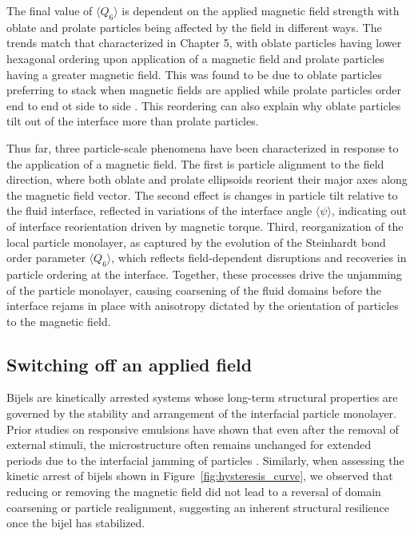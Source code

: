 The final value of \(\langle Q_6 \rangle\) is dependent on the applied magnetic field strength with oblate and prolate particles being affected by the field in
different ways. The trends match that characterized in Chapter 5, with oblate particles having lower hexagonal ordering upon application of a magnetic field
and prolate particles having a greater magnetic field. This was found to be due to oblate particles preferring to stack when magnetic fields are applied while
prolate particles order end to end ot side to side \cite{dabat_mesoscale_2018, eatson_capillary_2023}. This reordering can also explain why oblate particles
tilt out of the interface more than prolate particles.

Thus far, three particle-scale phenomena have been characterized in response to the application of a magnetic field. The first is
particle alignment to the field direction, where both oblate and prolate ellipsoids reorient their major axes along the magnetic field vector. The second effect is
changes in particle tilt relative to the fluid interface, reflected in variations of the interface angle \(\langle \psi \rangle\), indicating out of interface 
reorientation driven by magnetic torque. Third, reorganization of the local particle monolayer, as captured by the evolution of the Steinhardt bond order parameter 
\(\langle Q_6 \rangle\), which reflects field-dependent disruptions and recoveries in particle ordering at the interface. Together, these processes 
drive the unjamming of the particle monolayer, causing coarsening of the fluid domains before the interface rejams in place with anisotropy dictated by the orientation
of particles to the magnetic field.

\subsection{Switching off an applied field}
\label{decreasing-the-applied-field}

Bijels are kinetically arrested systems whose long-term structural properties are governed by the stability and arrangement 
of the interfacial particle monolayer. Prior studies on responsive emulsions have shown that even after the removal of external 
stimuli, the microstructure often remains unchanged for extended periods due to the interfacial 
jamming of particles \cite{cui_stabilizing_2013}. Similarly, when assessing the kinetic arrest of bijels shown 
in Figure~\ref{fig:hysteresis_curve}, we observed that reducing or removing the magnetic field did not 
lead to a reversal of domain coarsening or particle realignment, suggesting an inherent structural resilience once the bijel 
has stabilized.

